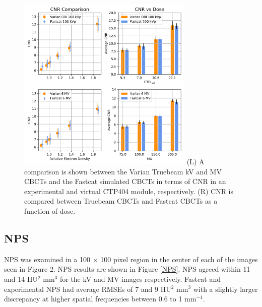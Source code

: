 \begin{figure}[ht!]
  \begin{center}
  \includegraphics[width=0.75\textwidth, clip]{figures/CNR_dose.pdf}
  {(L) A comparison is shown between the Varian Truebeam kV and MV CBCTs and the Fastcat simulated CBCTs in terms of CNR in an experimental and virtual CTP404 module, respectively. (R) CNR is compared between Truebeam CBCTs and Fastcat CBCTs as a function of dose. \label{CNR} 
    }  %
    \end{center}
\end{figure}

\subsection{NPS}

NPS was examined in a 100 $\times$ 100 pixel region in the center of each of the images seen in Figure 2. NPS results are shown in Figure \ref{NPS}. NPS agreed within 11 and 14 HU$^2$ mm$^3$ for the kV and MV images respectively. Fastcat and experimental NPS had average RMSEs of 7 and 9 HU$^2$ mm$^3$ with a slightly larger discrepancy at higher spatial frequencies between 0.6 to 1 mm$^{-1}$.

